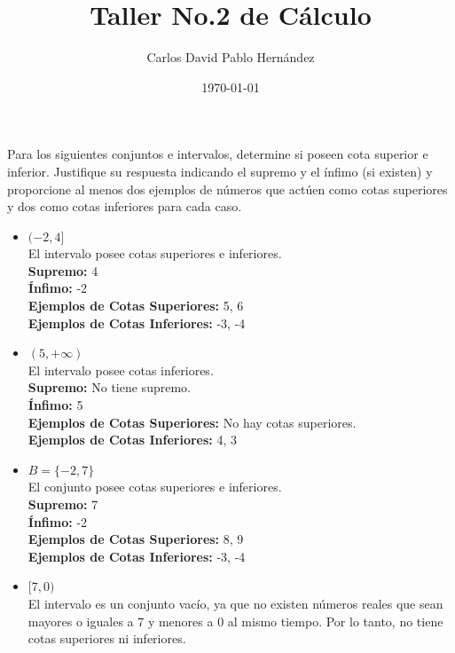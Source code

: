\documentclass[12pt]{article}
\title{Taller No.2 de Cálculo}
\author{Carlos David Pablo Hernández}
\date{\today}
\begin{document}
\maketitle
\section{} Para los siguientes conjuntos e intervalos, determine si poseen cota superior e inferior. Justifique su respuesta
indicando el supremo y el ínfimo (si existen) y proporcione al menos dos ejemplos de números que actúen como
cotas superiores y dos como cotas inferiores para cada caso.
\begin{itemize}
    \item $(-2, 4]$ \\
    El intervalo posee cotas superiores e inferiores. \\
    \textbf{Supremo:} 4 \\
    \textbf{Ínfimo:} -2\\
    \textbf{Ejemplos de Cotas Superiores:} 5, 6 \\
    \textbf{Ejemplos de Cotas Inferiores:} -3, -4 \\

     \item $(5, +\infty)$ \\
    El intervalo posee cotas inferiores. \\
    \textbf{Supremo:} No tiene supremo. \\
    \textbf{Ínfimo:} 5 \\
    \textbf{Ejemplos de Cotas Superiores:} No hay cotas superiores.\\
    \textbf{Ejemplos de Cotas Inferiores:} 4, 3 \\

     \item $B= \{-2, 7\} $ \\
    El conjunto posee cotas superiores e inferiores. \\
    \textbf{Supremo:} 7 \\
    \textbf{Ínfimo:} -2 \\
    \textbf{Ejemplos de Cotas Superiores:} 8, 9 \\
    \textbf{Ejemplos de Cotas Inferiores:} -3, -4 \\

     \item $[7, 0)$ \\
    El intervalo es un conjunto vacío, ya que no existen números reales
    que sean mayores o iguales a 7 y menores a 0 al mismo tiempo. 
    Por lo tanto, no tiene cotas superiores ni inferiores. \\


\end{itemize}
\end{document}
